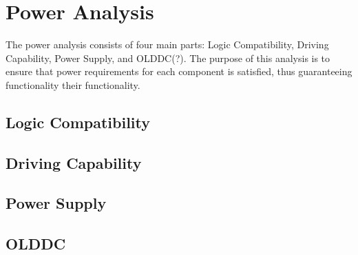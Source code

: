 \section{Power Analysis}
The power analysis consists of four main parts: Logic Compatibility, Driving Capability, Power Supply, and OLDDC(?). The purpose of this analysis is to ensure that power requirements for each component is satisfied, thus guaranteeing functionality their functionality.

\subsection{Logic Compatibility}

\subsection{Driving Capability}

\subsection{Power Supply}

\subsection{OLDDC}
